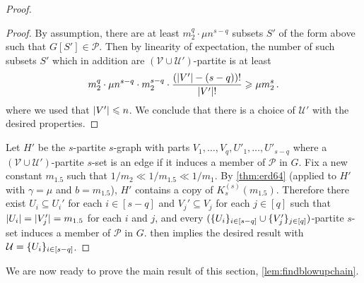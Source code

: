 \documentclass[12pt,reqno]{amsart}
\theoremstyle{plain}
\theoremstyle{definition}
\numberwithin{equation}{section}
\DeclarePairedDelimiter{\abs}{\lvert}{\rvert}
\DeclarePairedDelimiter{\set}{\{}{\}}
\renewcommand{\ge}{\geqslant}
\renewcommand{\le}{\leqslant}
\newcommand{\cP}{\mathcal{P}}
\newcommand{\cU}{\mathcal{U}}
\newcommand{\cV}{\mathcal{V}}
\begin{document}
\begin{proof}
\begin{proof}
			By assumption, there are at least $m_2^q \cdot \mu n^{s - q}$ subsets $S'$ of the form above such that $G[S'] \in \cP$.
			Then by linearity of expectation, the number of such subsets $S'$ which in addition are $(\cV \cup \cU')$-partite is at least
			\begin{equation*}
				m_2^q \cdot \mu n^{s - q} \cdot m_2^{s - q} \cdot \frac{(\abs{V'}-(s - q))!}{\abs{V'}!} \ge \mu m_2^s\, .
			\end{equation*}
			where we used that $\abs{V'} \le n$.
			We conclude that there is a choice of $\cU'$ with the desired properties.
		\end{proof}
		Let $H'$ be the $s$-partite $s$-graph with parts $V_1, \dotsc, V_q, U'_1, \dotsc, U'_{s - q}$ where a $(\cV \cup \cU')$-partite $s$-set is an edge if it induces a member of $\cP$ in $G$.
		Fix a new constant $m_{1.5}$ such that $1/m_2\ll 1/m_{1.5}\ll 1/m_1$. By \cref{thm:erd64} (applied to $H'$ with $\gamma = \mu$ and $b = m_{1.5}$), $H'$ contains a copy of $K_s^{(s)}(m_{1.5})$.
		Therefore there exist $U_i \subseteq U_i'$ for each $i \in [s - q]$ and $V_j' \subseteq V_j$ for each $j \in [q]$ such that $\abs{U_i} = \abs{V_j'} = m_{1.5}$ for each $i$ and $j$, and every $(\set{U_i}_{i \in [s - q]} \cup \set{V'_j}_{j \in [q]})$-partite $s$-set induces a member of $\cP$ in $G$.  then implies the desired result with $\cU = \set{U_i}_{i \in [s - q]}$.
	\end{proof}
	
	
	We are now ready to prove the main result of this section, \cref{lem:findblowupchain}.
	
\end{document}
